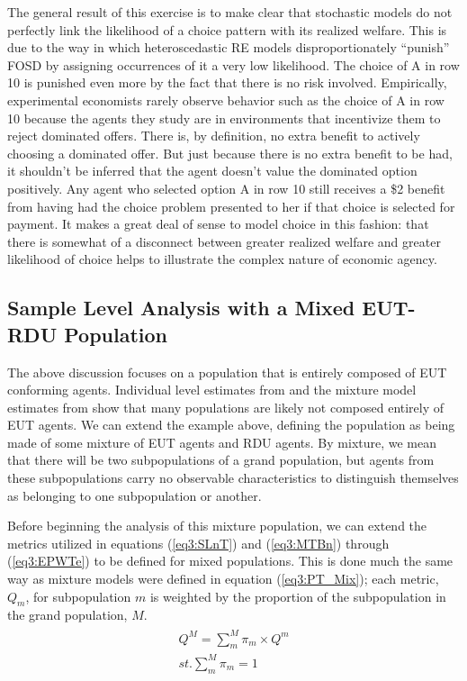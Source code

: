 \documentclass[../main.tex]{subfiles}
\begin{document}
The general result of this exercise is to make clear that stochastic models do not perfectly link the likelihood of a choice pattern with its realized welfare.
This is due to the way in which heteroscedastic RE models disproportionately \enquote{punish} FOSD by assigning occurrences of it a very low likelihood.
The choice of A in row 10 is punished even more by the fact that there is no risk involved.
Empirically, experimental economists rarely observe behavior such as the choice of A in row 10 because the agents they study are in environments that incentivize them to reject dominated offers.
There is, by definition, no extra benefit to actively choosing a dominated offer.
But just because there is no extra benefit to be had, it shouldn't be inferred that the agent doesn't value the dominated option positively.
Any agent who selected option A in row 10 still receives a \$2 benefit from having had the choice problem presented to her if that choice is selected for payment.
It makes a great deal of sense to model choice in this fashion: that there is somewhat of a disconnect between greater realized welfare and greater likelihood of choice helps to illustrate the complex nature of economic agency.

\subsection{Sample Level Analysis with a Mixed EUT-RDU Population}

The above discussion focuses on a population that is entirely composed of EUT conforming agents.
Individual level estimates from \textcite{Hey1994} and the mixture model estimates from \textcite{Harrison2008a} show that many populations are likely not composed entirely of EUT agents.
We can extend the example above, defining the population as being made of some mixture of EUT agents and RDU agents.
By mixture, we mean that there will be two subpopulations of a grand population, but agents from these subpopulations carry no observable characteristics to distinguish themselves as belonging to one subpopulation or another.

Before beginning the analysis of this mixture population, we can extend the metrics utilized in equations (\ref{eq3:SLnT}) and (\ref{eq3:MTBn}) through (\ref{eq3:EPWTe}) to be defined for mixed populations.
This is done much the same way as mixture models were defined in equation (\ref{eq3:PT_Mix}); each metric, $Q_m$, for subpopulation $m$ is weighted by the proportion of the subpopulation in the grand population, $M$.
\begin{align}
	\label{eq3:Metric_Mix}
	\begin{split}
		\bm{\mathit{Q^M}} = \sum_m^M \pi_m \times Q^m \\ 
		\mathit{st.} \sum_m^M \pi_m = 1
	\end{split}
\end{align}
\end{document}
